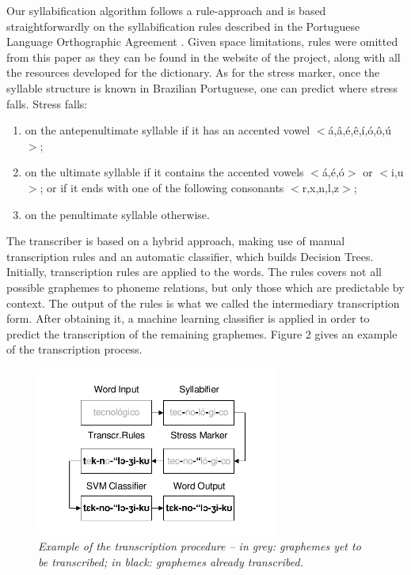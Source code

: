 Our syllabification algorithm follows a rule-approach and is based straightforwardly on the syllabification rules described in the Portuguese Language Orthographic Agreement \cite{Acordo2009}. Given space limitations, rules were omitted from this paper as they can be found in the website of the project, along with all the resources developed for the dictionary. As for the stress marker, once the syllable structure is known in Brazilian Portuguese, one can predict where stress falls. Stress falls:

\begin{enumerate}
 \item on the antepenultimate syllable if it has an accented vowel $<$\'a,\^a,\'e,\^e,\'i,\'o,\^o,\'u$>$;
 \item on the ultimate syllable if it contains the accented vowels $<$\'a,\'e,\'o$>$ or $<$i,u$>$; or if it ends with one of the following consonants $<$r,x,n,l,z$>$;
 \item on the penultimate syllable otherwise.
\end{enumerate}

The transcriber is based on a hybrid approach, making use of manual transcription rules and an automatic classifier, which builds Decision Trees. Initially, transcription rules are applied to the words. The rules covers not all possible graphemes to phoneme relations, but only those which are predictable by context. The output of the rules is what we called the intermediary transcription form. After obtaining it, a machine learning classifier is applied in order to predict the transcription of the remaining graphemes. Figure 2 gives an example of the transcription process.

\begin{figure}[!ht]
\centerline{ \includegraphics[width=8cm]{./gfx/aeiouado-transcript-ex.pdf}}
\caption{{\it Example of the transcription procedure -- in grey: graphemes yet to be transcribed; in black: graphemes already transcribed.}}
\label{transcExample}
\end{figure}

